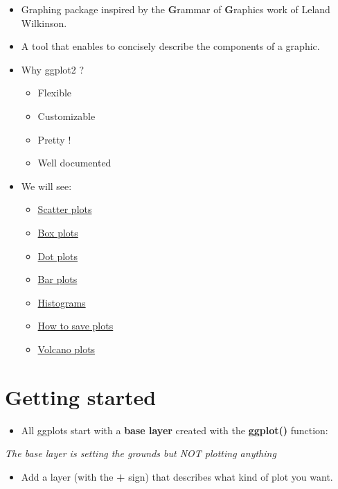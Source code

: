 \documentclass[]{book}
\providecommand{\tightlist}{%
  \setlength{\itemsep}{0pt}\setlength{\parskip}{0pt}}
\begin{document}
\begin{itemize}
\item
  Graphing package inspired by the \textbf{G}rammar of \textbf{G}raphics work of Leland Wilkinson.
\item
  A tool that enables to concisely describe the components of a graphic.
\item
  Why ggplot2 ?

  \begin{itemize}
  \tightlist
  \item
    Flexible
  \item
    Customizable
  \item
    Pretty !
  \item
    Well documented
  \end{itemize}
\item
  We will see:

  \begin{itemize}
  \tightlist
  \item
    \protect\hyperlink{gg_scatter}{Scatter plots}
  \item
    \protect\hyperlink{gg_box}{Box plots}
  \item
    \protect\hyperlink{gg_dot}{Dot plots}
  \item
    \protect\hyperlink{gg_bar}{Bar plots}
  \item
    \protect\hyperlink{gg_histo}{Histograms}
  \item
    \protect\hyperlink{gg_save}{How to save plots}
  \item
    \protect\hyperlink{gg_volc}{Volcano plots}
  \end{itemize}
\end{itemize}

\hypertarget{getting-started}{%
\section{Getting started}\label{getting-started}}

\begin{itemize}
\tightlist
\item
  All ggplots start with a \textbf{base layer} created with the \textbf{ggplot()} function:
\end{itemize}

\emph{The base layer is setting the grounds but NOT plotting anything}

\begin{itemize}
\tightlist
\item
  Add a layer (with the \textbf{+} sign) that describes what kind of plot you want.
\end{itemize}
\end{document}
